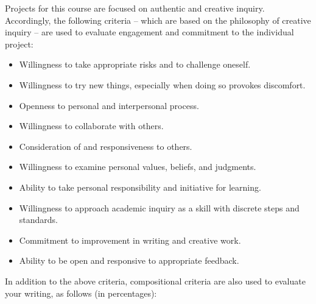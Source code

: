 \documentclass[letterpaper,10pt,headsepline]{scrreprt}
\begin{document}
Projects for this course are focused on authentic and creative inquiry. Accordingly, the following criteria -- which are based on the philosophy of creative inquiry  --  are used to evaluate engagement and commitment to the individual project:

\begin{itemize}
\item Willingness to take appropriate risks and to challenge oneself.
\item Willingness to try new things, especially when doing so provokes discomfort.
\item Openness to personal and interpersonal process.
\item Willingness to collaborate with others.
\item Consideration of and responsiveness to others.
\item Willingness to examine personal values, beliefs, and judgments.
\item Ability to take personal responsibility and initiative for learning.
\item Willingness to approach academic inquiry as a skill with discrete steps and standards.
\item Commitment to improvement in writing and creative work.
\item Ability to be open and responsive to appropriate feedback.
\end{itemize}

In addition to the above criteria, compositional criteria are also used to evaluate your writing, as follows (in percentages):
\end{document}
